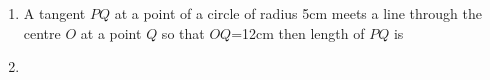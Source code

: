 \begin{enumerate}[label=\thesection.\arabic*,ref=\thesection.\theenumi]

\item A tangent $PQ$ at a point of a circle of radius 5cm meets a line through the centre $O$ at a point $Q$ so that $OQ$=12cm then length of $PQ$ is
\label{chapters/10/10/1/3}
\\
\solution

\item 
\label{chapters/10/10/1/4}


\end{enumerate}
